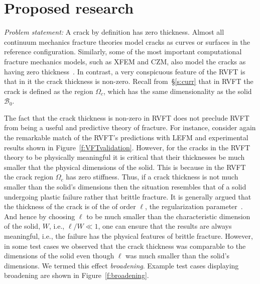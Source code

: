 \documentclass[10pt,letterpaper]{article}
\begin{document}
\section{Proposed research}
  \label{s:propres}
  \textit{Problem statement:}
    A  crack by definition has zero thickness.
    Almost all  continuum mechanics fracture theories model cracks as curves or  surfaces in the reference configuration.
    Similarly,  some of the most important computational fracture mechanics models, such as XFEM and CZM, also model the cracks as having zero thickness~\cite{day1994zero,benvenuti2008regularized}.
    In contrast, a very conspicuous feature of the RVFT is that in it the crack thickness is non-zero. Recall from~\S\ref{s:curr} that in RVFT the crack is defined as the region $\Omega_c$, which has the same dimensionality as the solid $\mathcal{B}_0$.

    The fact that the crack thickness is non-zero in RVFT does not preclude RVFT from being a useful and predictive theory of fracture.
    For instance, consider again the remarkable match of the RVFT's predictions with LEFM and experimental results shown in Figure~\ref{f:VFTvalidation}.
    However, for the cracks in the RVFT theory to be  physically meaningful it is critical that their thicknesses be much smaller that the physical dimensions of the solid.
    This is because in the RVFT the crack region $\Omega_{c}$ has zero stiffness.
    Thus, if a crack thickness is not much smaller than the solid's dimensions then the situation resembles that of a solid undergoing plastic failure rather that brittle fracture.
    It is generally argued that the thickness of the crack is of the of order  $\ell$, the regularization parameter~\cite{amiri2014phase}.
    And hence by choosing $\ell$ to be much smaller than the characteristic dimension of the solid, $W$, i.e., $\ell/W\ll 1$, one can ensure that the results are always meaningful, i.e., the failure has the physical features of  brittle fracture.
    However, in some test cases we observed that the crack thickness was comparable to the dimensions of the solid even though $\ell$ was much smaller than the solid's dimensions.
    We termed this effect \textit{broadening}.
    Example test cases displaying broadening are shown in  Figure~\ref{f:broadening}.
\end{document}

